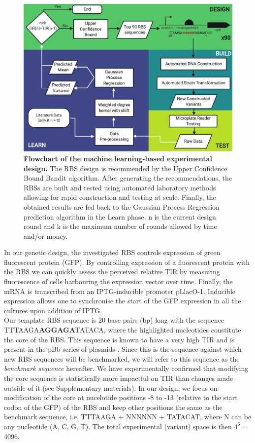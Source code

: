 \documentclass{article}
\begin{document}
\begin{figure}[h]
    \centering
    \includegraphics[scale=0.7]{plots/Main_Paper/flowchart.pdf}
    \caption{\textbf{Flowchart of the machine learning-based experimental design.} The RBS design is recommended by the Upper Confidence Bound Bandit algorithm. After generating the recommendations, the RBSs are built and tested using automated laboratory methods allowing for rapid construction and testing at scale. Finally, the obtained results are fed back to the Gaussian Process Regression prediction algorithm in the Learn phase. n is the current design round and k is the maximum number of rounds allowed by time and/or money.}
    \label{fig: Flowchart}
\end{figure}

In our genetic design, the investigated RBS controls expression of green fluorescent protein (GFP). 
By controlling expression of a fluorescent protein with the RBS we can quickly assess the perceived relative TIR by measuring fluorescence of cells harbouring the expression vector over time.
Finally, the mRNA is transcribed from an IPTG-inducible promoter pLlacO-1. 
Inducible expression allows one to synchronise the start of the GFP expression in all the cultures upon addition of IPTG.\\

Our template RBS sequence is 20 base pairs (bp) long with the sequence TTTAAGA\textbf{AGGAGA}TATACA, where the highlighted nucleotides constitute the core of the RBS.
This sequence is known to have a very high TIR and is present in the pBb series of plasmids \cite{Lee2011}. 
Since this is the sequence against which new RBS sequences will be benchmarked,
we will refer to this sequence as the \textit{benchmark sequence} hereafter.
We have experimentally confirmed that modifying the core sequence is statistically more impactful on TIR than changes made outside of it (see Supplementary materials).
In our design, we focus on modification of the core at nucelotide positions -8 to -13 (relative to the start codon of the GFP) of the RBS and keep other positions the same as the benchmark sequence, i.e. TTTAAGA + NNNNNN + TATACAT, where N can be any nucleotide (A, C, G, T). 
The total experimental (variant) space is then $4^6$ = 4096.
\end{document}
